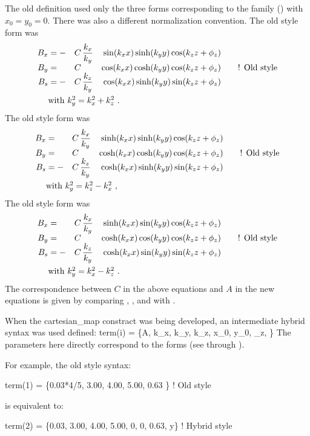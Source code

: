 {The old definition used only the three forms corresponding to the 
 family () with $x_0 = y_0 = 0$. There was also a different
normalization convention. The old style  form was
\begin{alignat}{5}
  B_x &= -& C \, &\dfrac{k_x}{k_y} & \sin(k_x x) \sinh(k_y y) \cos(\kzz) &\CRNEG
  B_y &=  & C \, &                 & \cos(k_x x) \cosh(k_y y) \cos(\kzz) &\qquad \text{! Old style} \CRNEG
  B_s &= -& C \, &\dfrac{k_z}{k_y} & \cos(k_x x) \sinh(k_y y) \sin(\kzz) &\label{f1} \\
  & \makebox[1pt][l]{with $k_y^2 = k_x^2 + k_z^2$ .} &&&&  \nonumber
\end{alignat}
The old style  form was
\begin{alignat}{5}
  B_x &=  & C \, &\dfrac{k_x}{k_y} & \sinh(k_x x) \sinh(k_y y) \cos(\kzz) &\CRNEG
  B_y &=  & C \, &                 & \cosh(k_x x) \cosh(k_y y) \cos(\kzz) &\qquad \text{! Old style} \CRNEG
  B_s &= -& C \, &\dfrac{k_z}{k_y} & \cosh(k_x x) \sinh(k_y y) \sin(\kzz) &\label{f2} \\
  & \makebox[1pt][l]{with $k_y^2 = k_z^2 - k_x^2$ ,} &&&&  \nonumber
\end{alignat}
The old style  form was
\begin{alignat}{5}
  B_x &=  & C \, &\dfrac{k_x}{k_y} & \sinh(k_x x) \sin(k_y y) \cos(\kzz) &\CRNEG
  B_y &=  & C \, &                 & \cosh(k_x x) \cos(k_y y) \cos(\kzz) &\qquad \text{! Old style} \CRNEG
  B_s &= -& C \, &\dfrac{k_z}{k_y} & \cosh(k_x x) \sin(k_y y) \sin(\kzz) &\label{f3} \\
  & \makebox[1pt][l]{with $k_y^2 = k_x^2 - k_z^2$ .} &&&& \nonumber
\end{alignat}
The correspondence between $C$ in the above equations and $A$ in the new equations is
given by comparing , , and  with .

When the {cartesian_map} constract was being developed, an intermediate hybrid syntax was used defined:
\Begineq
  term(i) = \{A, k_x, k_y, k_z, x_0, y_0, \phi_z, \}
\Endeq
The parameters here directly correspond to the  forms (see  through ).

For example, the old style syntax:
\begin{example}
  term(1) = \{0.03*4/5, 3.00, 4.00, 5.00, 0.63 \}    ! Old style
\end{example}
is equivalent to:
\begin{example}
  term(2) = \{0.03, 3.00, 4.00, 5.00, 0, 0, 0.63, y\}  ! Hybrid style
\end{example}

}
